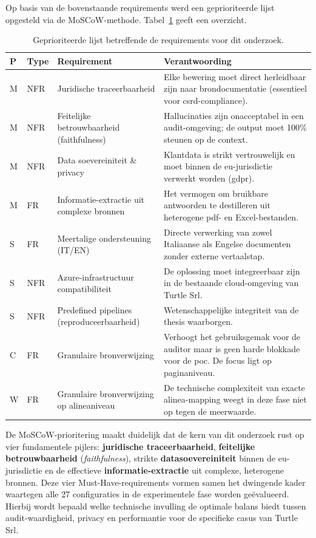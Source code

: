 Op basis van de bovenstaande requirements werd een geprioriteerde lijst opgesteld via de MoSCoW-methode. Tabel~\ref{tab:moscow} geeft een overzicht.

\begin{table}[h]
  \centering
  \begin{tabular}{p{} p{} p{} p{}}
    \toprule
    \textbf{P} & \textbf{Type} & \textbf{Requirement} & \textbf{Verantwoording} \\
    \midrule
    M & NFR & Juridische traceerbaarheid                   & Elke bewering moet direct herleidbaar zijn naar brondocumentatie (essentieel voor \gls{csrd}-compliance). \\
    M & NFR & Feitelijke betrouwbaarheid (faithfulness)    & Hallucinaties zijn onacceptabel in een audit-omgeving; de output moet 100\% steunen op de context. \\
    M & NFR & Data soevereiniteit \& privacy               & Klantdata is strikt vertrouwelijk en moet binnen de \gls{eu}-jurisdictie verwerkt worden (\gls{gdpr}). \\
    M & FR  & Informatie-extractie uit complexe bronnen    & Het vermogen om bruikbare antwoorden te destilleren uit heterogene \gls{pdf}- en Excel-bestanden. \\
    \midrule
    S & FR  & Meertalige ondersteuning (IT/EN)             & Directe verwerking van zowel Italiaanse als Engelse documenten zonder externe vertaalstap. \\
    S & NFR & Azure-infrastructuur compatibiliteit         & De oplossing moet integreerbaar zijn in de bestaande cloud-omgeving van Turtle Srl. \\
    S & NFR & Predefined pipelines (reproduceerbaarheid)   & Wetenschappelijke integriteit van de thesis waarborgen. \\
    \midrule
    C & FR  & Granulaire bronverwijzing                    & Verhoogt het gebruiksgemak voor de auditor maar is geen harde blokkade voor de \gls{poc}. De focus ligt op paginaniveau. \\
    \midrule
    W & FR  & Granulaire bronverwijzing op alineaniveau    & De technische complexiteit van exacte alinea-mapping weegt in deze fase niet op tegen de meerwaarde. \\
    \bottomrule
  \end{tabular}
  \caption[MoSCoW-prioritering van de requirements]{\label{tab:moscow}Geprioriteerde lijst betreffende de requirements voor dit onderzoek.}
\end{table}

De MoSCoW-prioritering maakt duidelijk dat de kern van dit onderzoek rust op vier fundamentele pijlers: \textbf{juridische traceerbaarheid}, \textbf{feitelijke betrouwbaarheid} (\textit{faithfulness}), strikte \textbf{datasoevereiniteit} binnen de \gls{eu}-jurisdictie en de effectieve \textbf{informatie-extractie} uit complexe, heterogene bronnen. Deze vier Must-Have-requirements vormen samen het dwingende kader waartegen alle 27 configuraties in de experimentele fase worden geëvalueerd. Hierbij wordt bepaald welke technische invulling de optimale balans biedt tussen audit-waardigheid, privacy en performantie voor de specifieke casus van Turtle Srl.